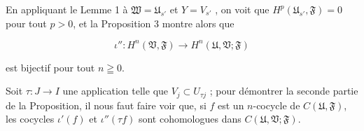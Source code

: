 En appliquant le Lemme 1 à $\mathfrak{W} = \mathfrak{U}_{s'}$ et $Y = V_{s'}$ , on voit que $H^p(\mathfrak{U}_{s'} , \mathfrak{F}) = 0$ pour tout $p > 0$, et la Proposition 3 montre alors que

\begin{equation*}
\iota'' : H^n(\mathfrak{V}, \mathfrak{F}) \longrightarrow H^n(\mathfrak{U}, \mathfrak{V}; \mathfrak{F})
\end{equation*}

est bijectif pour tout $n \geqq 0$.

Soit $\tau: J \rightarrow I$ une application telle que $V_j \subset U_{\tau j}$ ; pour démontrer la seconde partie de la Proposition, il nous faut faire voir que, si $f$ est un $n$-cocycle de $C(\mathfrak{U}, \mathfrak{F})$, les cocycles $\iota'(f)$ et $\iota''(\tau f)$ sont cohomologues dans $C(\mathfrak{U}, \mathfrak{V}; \mathfrak{F})$.
